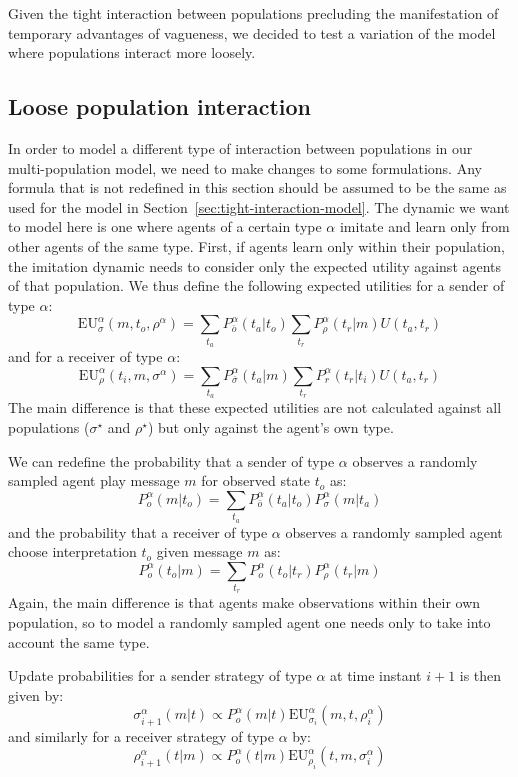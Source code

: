 \documentclass[a4paper]{article}
\begin{document}
Given the tight interaction between populations precluding the manifestation of temporary advantages of vagueness, we decided to test a variation of the model where populations interact more loosely.

\subsection{Loose population interaction}
\label{sec:loose-interaction-model}
In order to model a different type of interaction between populations in our multi-population model, we need to make changes to some formulations.
Any formula that is not redefined in this section should be assumed to be the same as used for the model in Section~\ref{sec:tight-interaction-model}.
The dynamic we want to model here is one where agents of a certain type $\alpha$ imitate and learn only from other agents of the same type.
First, if agents learn only within their population, the imitation dynamic needs to consider only the expected utility against agents of that population.
We thus define the following expected utilities for a sender of type $\alpha$:
$$
\text{EU}_{\sigma}^{\alpha}(m,t_{o},\rho^{\alpha})=\sum_{t_{a}}P_{\bar{o}}^{\alpha}(t_{a}|t_{o})\sum_{t_{r}}P_{\rho}^{\alpha}(t_{r}|m)U(t_{a},t_{r})
$$
and for a receiver of type $\alpha$:
$$
\text{EU}_{\rho}^{\alpha}(t_{i},m,\sigma^{\alpha})=\sum_{t_{a}}P_{\bar{\sigma}}^{\alpha}(t_{a}|m)\sum_{t_{r}}P_{r}^{\alpha}(t_{r}|t_{i})U(t_{a},t_{r})
$$
The main difference is that these expected utilities are not calculated against all populations ($\sigma^\star$ and $\rho^\star$) but only against the agent's own type.

We can redefine the probability that a sender of type $\alpha$ observes a randomly sampled agent play message $m$ for observed state $t_o$ as:
$$
P_{o}^{\alpha}(m|t_{o})=\sum_{t_{a}}P_{\bar{o}}^{\alpha}(t_{a}|t_{o})P_{\sigma}^{\alpha}(m|t_{a})
$$
and the probability that a receiver of type $\alpha$ observes a randomly sampled agent choose interpretation $t_o$ given message $m$ as:
$$
P_{o}^{\alpha}(t_{o}|m)=\sum_{t_{r}}P_{o}^{\alpha}(t_{o}|t_{r})P_{\rho}^{\alpha}(t_{r}|m)
$$
Again, the main difference is that agents make observations within their own population, so to model a randomly sampled agent one needs only to take into account the same type.

Update probabilities for a sender strategy of type $\alpha$ at time instant $i+1$ is then given by:
$$
\sigma_{i+1}^{\alpha}(m|t) \propto P_{o}^{\alpha}(m|t)\text{EU}_{\sigma_{i}}^{\alpha}(m,t,\rho_{i}^{\alpha})
$$
and similarly for a receiver strategy of type $\alpha$ by:
$$
\rho_{i+1}^{\alpha}(t|m) \propto P_{o}^{\alpha}(t|m)\text{EU}_{\rho_{i}}^{\alpha}(t,m,\sigma_{i}^{\alpha})
$$
\end{document}
